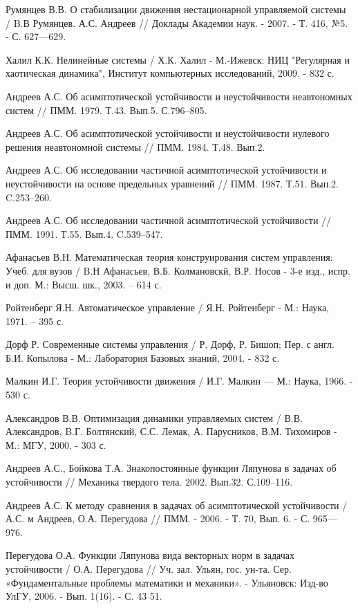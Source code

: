 \begin{thebibliography}{10}
	Румянцев В.В. О стабилизации движения нестационарной управляемой системы / B.В Румянцев. А.С. Андреев // Доклады Академии наук. - 2007. - Т. 416, №5. - С. 627—629.
	
	Халил К.К. Нелинейные системы / Х.К. Халил - М.-Ижевск: НИЦ "Регулярная и хаотическая динамика", Институт компьютерных исследований, 2009. - 832 с.
	
	Андреев А.С. Об асимптотической устойчивости и неустойчивости неавтономных систем // ПММ. 1979. Т.43. Вып.5. С.796--805.
	
	Андреев А.С. Об асимптотической устойчивости и неустойчивости нулевого решения неавтономной системы // ПММ. 1984. Т.48. Вып.2.
	
	Андреев А.С. Об исследовании частичной асимптотической устойчивости и неустойчивости на основе предельных уравнений // ПММ. 1987. Т.51. Вып.2. C.253--260.
	
	Андреев А.С. Об исследовании частичной асимптотической устойчивости // ПММ. 1991. Т.55.
	Вып.4. C.539--547.
	
	Афанасьев В.Н. Математическая теория конструирования систем управления: Учеб. для вузов / B.Н Афанасьев, В.Б. Колмановскй, В.Р. Носов - 3-е изд., испр. и доп. М.: Высш. шк., 2003. -- 614 с.
	
	Ройтенберг Я.Н. Автоматическое управление / Я.Н. Ройтенберг - М.: Наука, 1971. -- 395 с.
	
	Дорф Р. Современные системы управления / Р. Дорф, Р. Бишоп; Пер. с англ. Б.И. Копылова - М.: Лаборатория Базовых знаний, 2004. - 832 с.
	
	Малкин И.Г. Теория устойчивости движения / И.Г. Малкин — М.: Наука, 1966. - 530 с.
	
	Александров В.В. Оптимизация динамики управляемых систем / В.В. Александров, B.Г. Болтянский, С.С. Лемак, А. Парусников, В.М. Тихомиров - М.: МГУ, 2000. - 303 с.
	
	Андреев А.С., Бойкова Т.А. Знакопостоянные функции Ляпунова в задачах об устойчивости // Механика твердого тела. 2002. Вып.32. С.109--116.
	
	Андреев А.С. К методу сравнения в задачах об асимптотической устойчивости / А.С. м Андреев, О.А. Перегудова // ПММ. - 2006. - Т. 70, Вып. 6. - С. 965—976.
	
	Перегудова О.А. Функции Ляпунова вида векторных норм в задачах устойчивости / О.А. Перегудова // Уч. зал. Ульян, гос. ун-та. Сер. «Фундаментальные проблемы математики и механики». - Ульяновск: Изд-во УлГУ, 2006. - Вып. 1(16). - С. 43	51.
	

\end{thebibliography}

